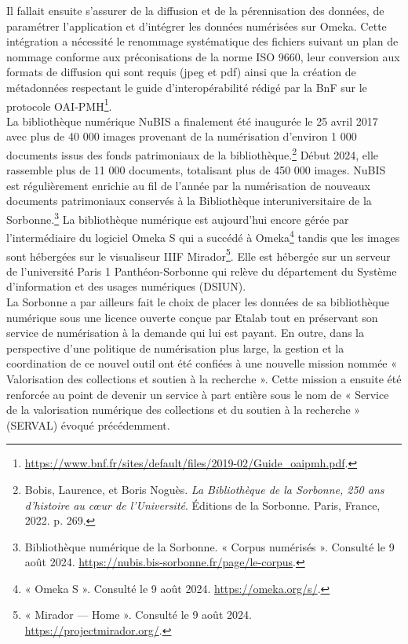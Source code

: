 \documentclass[a4paper,12pt,twoside]{book}
\begin{document}
Il fallait ensuite s'assurer de la diffusion et de la pérennisation des données, de paramétrer l'application et d'intégrer les données numérisées sur Omeka. Cette intégration a nécessité le renommage systématique des fichiers suivant un plan de nommage conforme aux préconisations de la norme ISO 9660, leur conversion aux formats de diffusion qui sont requis (jpeg et pdf) ainsi que la création de métadonnées respectant le guide d'interopérabilité rédigé par la BnF sur le protocole OAI-PMH\footnote{
	\url{https://www.bnf.fr/sites/default/files/2019-02/Guide_oaipmh.pdf}.}. \\

La bibliothèque numérique NuBIS a finalement été inaugurée le 25 avril 2017 avec plus de 40 000 images
provenant de la numérisation d'environ 1 000 documents issus des fonds
patrimoniaux de la bibliothèque.\footnote{Bobis, Laurence, et Boris Noguès. \emph{La Bibliothèque de la Sorbonne, 250 ans d’histoire au cœur de l’Université}. Éditions de la Sorbonne. Paris, France, 2022. p. 269.} Début 2024, elle rassemble plus de 11
000 documents, totalisant plus de 450 000 images. NuBIS est
régulièrement enrichie au fil de l'année par la
numérisation de nouveaux documents patrimoniaux conservés à la
Bibliothèque interuniversitaire de la Sorbonne.\footnote{Bibliothèque
	numérique de la Sorbonne. « Corpus numérisés ». Consulté le 9 août
	2024.
	\url{https://nubis.bis-sorbonne.fr/page/le-corpus}.}
La bibliothèque numérique est aujourd'hui encore gérée par l'intermédiaire du logiciel Omeka
S qui a succédé à Omeka\footnote{« Omeka S ». Consulté le 9 août 2024.
	\url{https://omeka.org/s/}.} tandis que
les images sont hébergées sur le visualiseur IIIF Mirador\footnote{«
	Mirador --- Home ». Consulté le 9 août 2024.
	\url{https://projectmirador.org/}.}. Elle est hébergée sur un serveur de l'université Paris 1 Panthéon-Sorbonne qui relève du département du Système d'information et des usages numériques (DSIUN). \\

La Sorbonne a par ailleurs fait le choix de placer les données de sa bibliothèque numérique sous une licence ouverte conçue par Etalab tout en préservant son service de numérisation à la demande qui lui est payant. En outre, dans la perspective d'une politique de numérisation plus large, la gestion et la coordination de ce nouvel outil ont été confiées à une nouvelle mission nommée « Valorisation des collections et soutien à la recherche ». Cette mission a ensuite été renforcée au point de devenir un service à part entière sous le nom de « Service de la valorisation numérique des collections et du soutien à la recherche  » (SERVAL) évoqué précédemment. \\ 
\end{document}
